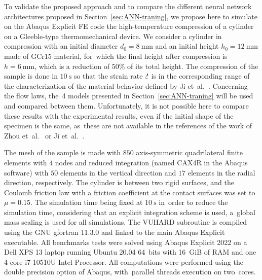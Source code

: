 \documentclass[algorithms,article,accept,pdftex,moreauthors]{Definitions/mdpi}
\DeclareRobustCommand{\mdot}[1]{\accentset{\mbox{\bfseries .}}{#1}}
\begin{document}
To validate the proposed approach and to compare the different neural network architectures proposed in Section~\ref{sec:ANN-traning}, we propose here to simulate on the Abaqus Explicit FE code the high-temperature compression of a cylinder on a Gleeble-type thermomechanical device.
We consider a cylinder in compression with an initial diameter $d_0=8~\text{mm}$ and an initial height $h_0=12~\text{mm}$ made of GCr15 material, for~which the final height after compression is $h=6~\text{mm}$, which is a reduction of $50\%$ of its total height.
The compression of the sample is done in $10~\text{s}$ so that the strain rate  $\mdot\varepsilon$ is in the corresponding range of the characterization of the material behavior defined by Ji et~al.~\cite{Ji-2018}.
Concerning the flow laws, the~4 models presented in Section~\ref{sec:ANN-traning} will be used and compared between them.
Unfortunately, it is not possible here to compare these results with the experimental results, even if the initial shape of the specimen is the same, as~these are not available in the references of the work of Zhou et~al.~\cite{Zhou-2020} or Ji et~al.~\cite{Ji-2018}.

The mesh of the sample is made with $850$ axis-symmetric quadrilateral finite elements with $4$ nodes and reduced integration (named CAX4R in the Abaqus software) with $50$ elements in the vertical direction and $17$ elements in the radial direction, respectively.
The cylinder is between two rigid surfaces, and the Coulomb friction law with a friction coefficient at the contact surfaces was set to $\mu=0.15$.
The simulation time being fixed at $10~\text{s}$ in~order to reduce the simulation time, considering that an explicit integration scheme is used, a~global mass scaling is used for all simulations.
The VUHARD subroutine is compiled using the GNU gfortran 11.3.0 and linked to the main Abaqus Explicit executable.
All benchmarks tests were solved using Abaqus Explicit 2022 on a Dell XPS 13 laptop running Ubuntu 20.04 64~bits with 16~GiB of RAM and one 4 core i7-10510U Intel Processor.
All computations were performed using the double precision option of Abaqus, with~parallel threads execution on two~cores.
\end{document}
